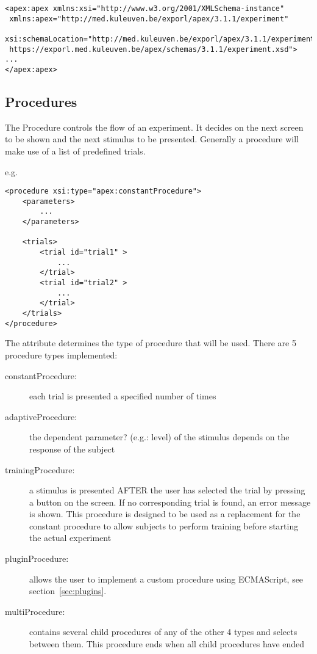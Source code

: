 \begin{lstlisting}
<apex:apex xmlns:xsi="http://www.w3.org/2001/XMLSchema-instance"
 xmlns:apex="http://med.kuleuven.be/exporl/apex/3.1.1/experiment"
 xsi:schemaLocation="http://med.kuleuven.be/exporl/apex/3.1.1/experiment
 https://exporl.med.kuleuven.be/apex/schemas/3.1.1/experiment.xsd">
...
</apex:apex>
\end{lstlisting}



\subsection{Procedures}

\label{sec:procedures}

The Procedure controls the flow of an experiment. It decides on the
next screen to be shown and the next stimulus to be presented.
Generally a procedure will make use of a list of predefined
trials.

e.g. 
\begin{lstlisting}
<procedure xsi:type="apex:constantProcedure">
    <parameters>
        ...
    </parameters>

    <trials>
        <trial id="trial1" >
            ...
        </trial>
        <trial id="trial2" >
            ...
        </trial>
    </trials>
</procedure>
\end{lstlisting}


The  attribute determines the type of
procedure that will be used. There are 5 procedure types
implemented:

\begin{description}


\item[constantProcedure:] each trial is presented a specified number of times


\item [adaptiveProcedure:] the dependent parameter? (e.g.: level) of the
stimulus depends on the response of the subject

\item [trainingProcedure:] a stimulus is presented AFTER the
user has selected the trial by pressing a button on the screen.
If no corresponding trial is found, an error message is shown.
This procedure is designed to be used as a replacement for the
constant procedure to allow subjects to perform training before
starting the actual experiment

\item [pluginProcedure:] allows the user to implement a custom
procedure using ECMAScript, see section~\ref{sec:plugins}.

\item [multiProcedure:] contains several child procedures of any of the other 4 types and
selects between them. This procedure ends when all child
procedures have ended
\end{description}

